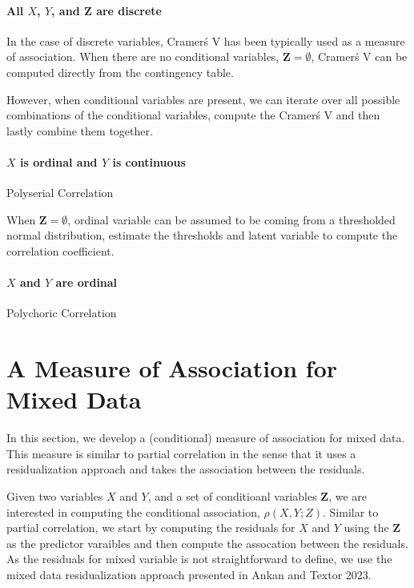 \documentclass[letterpaper]{article} %
\begin{document}
\paragraph{All $ X $, $ Y $, and $ \bm{Z} $ are discrete}

In the case of discrete variables, Cramer\'s V has been typically used as a
measure of association. When there are no conditional variables, $ \bm{Z} = \emptyset $,
Cramer\'s V can be computed directly from the contingency table.

However, when conditional variables are present, we can iterate over all
possible combinations of the conditional variables, compute the Cramer\'s V and
then lastly combine them together. 


\paragraph{$ X $ is ordinal and $ Y $ is continuous}
Polyserial Correlation

When $ \bm{Z} = \emptyset $, ordinal variable can be assumed to be coming from
a thresholded normal distribution, estimate the thresholds and latent variable
to compute the correlation coefficient.

\paragraph{$ X $ and $ Y $ are ordinal}
Polychoric Correlation

\section{A Measure of Association for Mixed Data}
\label{sec:mixed_association}

In this section, we develop a (conditional) measure of association for mixed
data. This measure is similar to partial correlation in the sense that it uses
a residualization approach and takes the association between the residuals.

Given two variables $ X $ and $ Y $, and a set of conditioanl variables $
\bm{Z} $, we are interested in computing the conditional association, $ \rho(X,
Y; Z) $. Similar to partial correlation, we start by computing the residuals
for $ X $ and $ Y $ using the $ \bm{Z} $ as the predictor varaibles and then
compute the assocation between the residuals. As the residuals for mixed
variable is not straightforward to define, we use the mixed data
residualization approach presented in Ankan and Textor 2023.
\end{document}
